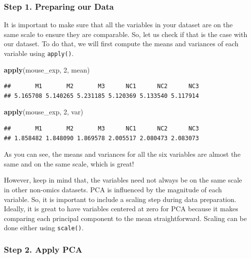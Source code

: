 \documentclass[
]{book}
\newenvironment{Shaded}{\begin{snugshade}}{\end{snugshade}}
\newcommand{\DecValTok}[1]{\textcolor[rgb]{0.00,0.00,0.81}{#1}}
\newcommand{\FunctionTok}[1]{\textcolor[rgb]{0.13,0.29,0.53}{\textbf{#1}}}
\newcommand{\NormalTok}[1]{#1}
\begin{document}
\subsubsection{Step 1. Preparing our Data}\label{step-1.-preparing-our-data}

It is important to make sure that all the variables in your dataset are on the same scale to ensure they are comparable. So, let us check if that is the case with our dataset. To do that, we will first compute the means and variances of each variable using \texttt{apply()}.

\begin{Shaded}
\begin{Highlighting}[]
\FunctionTok{apply}\NormalTok{(mouse\_exp, }\DecValTok{2}\NormalTok{, mean)}
\end{Highlighting}
\end{Shaded}

\begin{verbatim}
##       M1       M2       M3      NC1      NC2      NC3 
## 5.165708 5.140265 5.231185 5.120369 5.133540 5.117914
\end{verbatim}

\begin{Shaded}
\begin{Highlighting}[]
\FunctionTok{apply}\NormalTok{(mouse\_exp, }\DecValTok{2}\NormalTok{, var)}
\end{Highlighting}
\end{Shaded}

\begin{verbatim}
##       M1       M2       M3      NC1      NC2      NC3 
## 1.858482 1.848090 1.869578 2.005517 2.080473 2.083073
\end{verbatim}

As you can see, the means and variances for all the six variables are almost the same and on the same scale, which is great!

However, keep in mind that, the variables need not always be on the same scale in other non-omics datasets. PCA is influenced by the magnitude of each variable. So, it is important to include a scaling step during data preparation. Ideally, it is great to have variables centered at zero for PCA because it makes comparing each principal component to the mean straightforward. Scaling can be done either using \texttt{scale()}.

\subsubsection{Step 2. Apply PCA}\label{step-2.-apply-pca}
\end{document}
